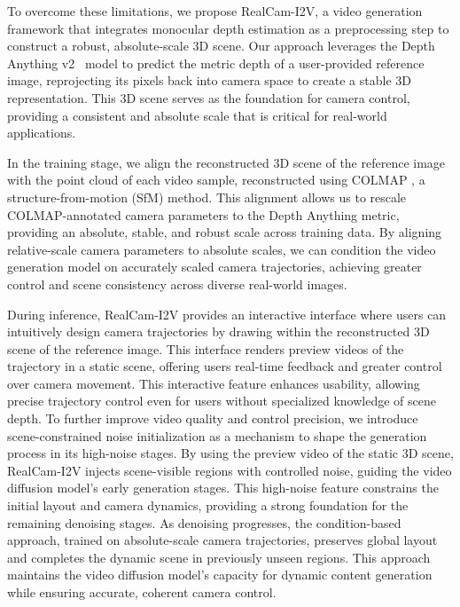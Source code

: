 To overcome these limitations, we propose RealCam-I2V, a video generation framework that integrates monocular depth estimation as a preprocessing step to construct a robust, absolute-scale 3D scene. Our approach leverages the Depth Anything v2~\cite{depth_anything_v2} model to predict the metric depth of a user-provided reference image, reprojecting its pixels back into camera space to create a stable 3D representation. This 3D scene serves as the foundation for camera control, providing a consistent and absolute scale that is critical for real-world applications.

In the training stage, we align the reconstructed 3D scene of the reference image with the point cloud of each video sample, reconstructed using COLMAP \cite{Schonberger2016}, a structure-from-motion (SfM) method. This alignment allows us to rescale COLMAP-annotated camera parameters to the Depth Anything metric, providing an absolute, stable, and robust scale across training data. By aligning relative-scale camera parameters to absolute scales, we can condition the video generation model on accurately scaled camera trajectories, achieving greater control and scene consistency across diverse real-world images.

During inference, RealCam-I2V provides an interactive interface where users can intuitively design camera trajectories by drawing within the reconstructed 3D scene of the reference image. This interface renders preview videos of the trajectory in a static scene, offering users real-time feedback and greater control over camera movement. This interactive feature enhances usability, allowing precise trajectory control even for users without specialized knowledge of scene depth.
To further improve video quality and control precision, we introduce scene-constrained noise initialization as a mechanism to shape the generation process in its high-noise stages. By using the preview video of the static 3D scene, RealCam-I2V injects scene-visible regions with controlled noise, guiding the video diffusion model’s early generation stages. This high-noise feature constrains the initial layout and camera dynamics, providing a strong foundation for the remaining denoising stages. As denoising progresses, the condition-based approach, trained on absolute-scale camera trajectories, preserves global layout and completes the dynamic scene in previously unseen regions. This approach maintains the video diffusion model’s capacity for dynamic content generation while ensuring accurate, coherent camera control.

